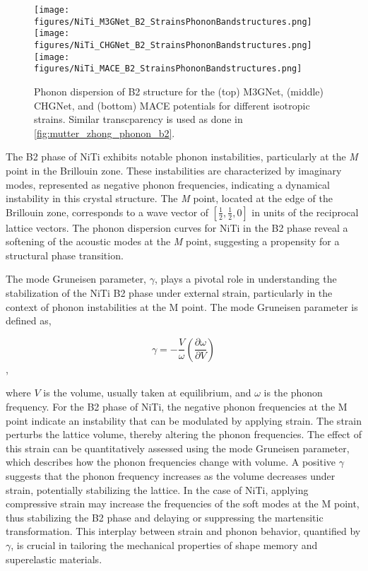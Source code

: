 \documentclass[preprint,colorlinks=true,linkcolor=black,citecolor=black]{elsarticle}
\begin{document}
\begin{figure}[!htp]
    \begin{centering}
      \texttt{[image: figures/NiTi\_M3GNet\_B2\_StrainsPhononBandstructures.png]}
      \vspace{1mm}
      \texttt{[image: figures/NiTi\_CHGNet\_B2\_StrainsPhononBandstructures.png]}
      \vspace{1mm}
      \texttt{[image: figures/NiTi\_MACE\_B2\_StrainsPhononBandstructures.png]}
      \caption{
        Phonon dispersion of B2 structure for the (top) M3GNet, (middle) CHGNet, and (bottom) MACE potentials for different isotropic strains. Similar transcparency is used as done in \ref{fig:mutter_zhong_phonon_b2}.
      }
      \label{fig:gnn_phonon_b2}
    \end{centering}
\end{figure}


The B2 phase of NiTi exhibits notable phonon instabilities, particularly at the \textit{M} point in the Brillouin zone. These instabilities are characterized by imaginary modes, represented as negative phonon frequencies, indicating a dynamical instability in this crystal structure. The \textit{M} point, located at the edge of the Brillouin zone, corresponds to a wave vector of $\left[\frac{1}{2}, \frac{1}{2}, 0\right]$ in units of the reciprocal lattice vectors. The phonon dispersion curves for NiTi in the B2 phase reveal a softening of the acoustic modes at the \textit{M} point, suggesting a propensity for a structural phase transition. \par

The mode Gruneisen parameter, $\gamma$, plays a pivotal role in understanding the stabilization of the NiTi B2 phase under external strain, particularly in the context of phonon instabilities at the M point. The mode Gruneisen parameter is defined as,

\begin{equation}
  \label{eq:modegruneisen}
  \gamma = -\frac{V}{\omega}\left(\frac{\partial \omega}{\partial V}\right)
\end{equation},

where $V$ is the volume, usually taken at equilibrium, and $\omega$ is the phonon frequency. For the B2 phase of NiTi, the negative phonon frequencies at the M point indicate an instability that can be modulated by applying strain. The strain perturbs the lattice volume, thereby altering the phonon frequencies. The effect of this strain can be quantitatively assessed using the mode Gruneisen parameter, which describes how the phonon frequencies change with volume. A positive $\gamma$ suggests that the phonon frequency increases as the volume decreases under strain, potentially stabilizing the lattice. In the case of NiTi, applying compressive strain may increase the frequencies of the soft modes at the M point, thus stabilizing the B2 phase and delaying or suppressing the martensitic transformation. This interplay between strain and phonon behavior, quantified by $\gamma$, is crucial in tailoring the mechanical properties of shape memory and superelastic materials.
\end{document}
